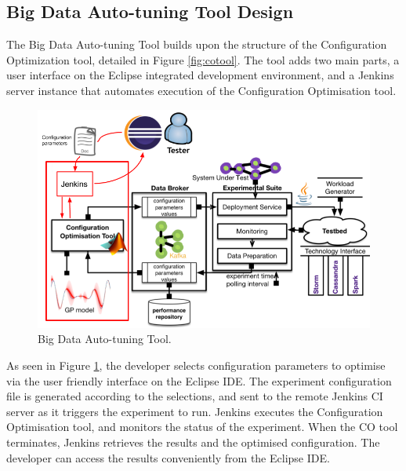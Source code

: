 \newpage
\subsection{Big Data Auto-tuning Tool Design}
The Big Data Auto-tuning Tool builds upon the structure of the Configuration Optimization tool, detailed in Figure \ref{fig:cotool}. The tool adds two main parts, a user interface on the Eclipse integrated development environment, and a Jenkins server instance that automates execution of the Configuration Optimisation tool.
\begin{figure}[h]
\centering
\caption{Big Data Auto-tuning Tool.}
\label{fig:tooldesign}
\includegraphics[width=\textwidth]{images/tooldesign.png}
\end{figure}
As seen in Figure \ref{fig:tooldesign}, the developer selects configuration parameters to optimise via the user friendly interface on the Eclipse IDE. The experiment configuration file is generated according to the selections, and sent to the remote Jenkins CI server as it triggers the experiment to run. Jenkins executes the Configuration Optimisation tool, and monitors the status of the experiment. When the CO tool terminates, Jenkins retrieves the results and the optimised configuration. The developer can access the results conveniently from the Eclipse IDE.\\
